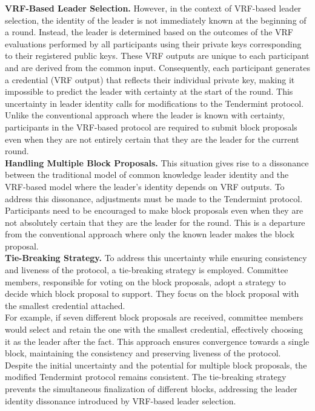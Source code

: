 \noindent
\textbf{VRF-Based Leader Selection.} However, in the context of VRF-based leader selection, the identity of the leader is not immediately known at the beginning of a round. Instead, the leader is determined based on the outcomes of the VRF evaluations performed by all participants using their private keys corresponding to their registered public keys. These VRF outputs are unique to each participant and are derived from the common input. Consequently, each participant generates a credential (VRF output) that reflects their individual private key, making it impossible to predict the leader with certainty at the start of the round. This uncertainty in leader identity calls for modifications to the Tendermint protocol. Unlike the conventional approach where the leader is known with certainty, participants in the VRF-based protocol are required to submit block proposals even when they are not entirely certain that they are the leader for the current round.\\

\noindent
\textbf{Handling Multiple Block Proposals.} This situation gives rise to a dissonance between the traditional model of common knowledge leader identity and the VRF-based model where the leader's identity depends on VRF outputs. To address this dissonance, adjustments must be made to the Tendermint protocol. Participants need to be encouraged to make block proposals even when they are not absolutely certain that they are the leader for the round. This is a departure from the conventional approach where only the known leader makes the block proposal.\\

\noindent
\textbf{Tie-Breaking Strategy.} To address this uncertainty while ensuring consistency and liveness of the protocol, a tie-breaking strategy is employed. Committee members, responsible for voting on the block proposals, adopt a strategy to decide which block proposal to support. They focus on the block proposal with the smallest credential attached.\\
For example, if seven different block proposals are received, committee members would select and retain the one with the smallest credential, effectively choosing it as the leader after the fact. This approach ensures convergence towards a single block, maintaining the consistency and preserving liveness of the protocol.\\
Despite the initial uncertainty and the potential for multiple block proposals, the modified Tendermint protocol remains consistent. The tie-breaking strategy prevents the simultaneous finalization of different blocks, addressing the leader identity dissonance introduced by VRF-based leader selection.
